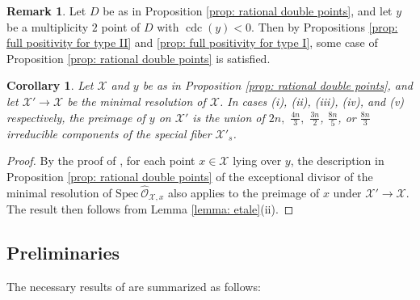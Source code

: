 \documentclass[12pt]{amsart}
\numberwithin{equation}{section}
\newtheorem{corollary}[equation]{Corollary}
\theoremstyle{definition}
\newtheorem{remark}[equation]{Remark}
\renewcommand{\O}{\mathcal{O}}
\newcommand{\Spec}{\mathrm{Spec} \ }
\newcommand{\X}{\mathcal{X}}
\DeclareMathOperator{\cdc}{cdc}
\begin{document}
\begin{remark}\label{rmk: cdc negative}
   Let $D$ be as in Proposition \ref{prop: rational double points}, and let $y$ be a multiplicity $2$ point of $D$ with $\cdc(y)<0$. Then by Propositions \ref{prop: full positivity for type II} and \ref{prop: full positivity for type I}, some case of Proposition \ref{prop: rational double points} is satisfied.
\end{remark}

\begin{corollary}\label{cor: comps upstairs}
    Let $\X$ and $y$ be as in Proposition \ref{prop: rational double points}, and let $\X'\to\X$ be the minimal resolution of $\X$. In cases \textup{(i)}, \textup{(ii)}, \textup{(iii)}, \textup{(iv)}, and \textup{(v)} respectively, the preimage of $y$ on $\X'$ is the union of $2n,$ $\frac{4n}{3},$ $\frac{3n}{2}$, $\frac{8n}{5}$, or $\frac{8n}{3}$ irreducible components of the special fiber $\X'_s$.
\end{corollary}
\begin{proof}
    By the proof of \cite[Lemma 3.5]{ObusWewers}, for each point $x\in\X$ lying over $y$, the description in Proposition \ref{prop: rational double points} of the exceptional divisor of the minimal resolution of $\Spec\widehat{\O}_{\X,x}$ also applies to the preimage of $x$ under $\X'\to\X$. The result then follows from Lemma \ref{lemma: etale}(ii).
\end{proof}


\subsection{Preliminaries}\hfill

The necessary results of \cite[Section 24]{Lip69} are summarized as follows:
\end{document}
